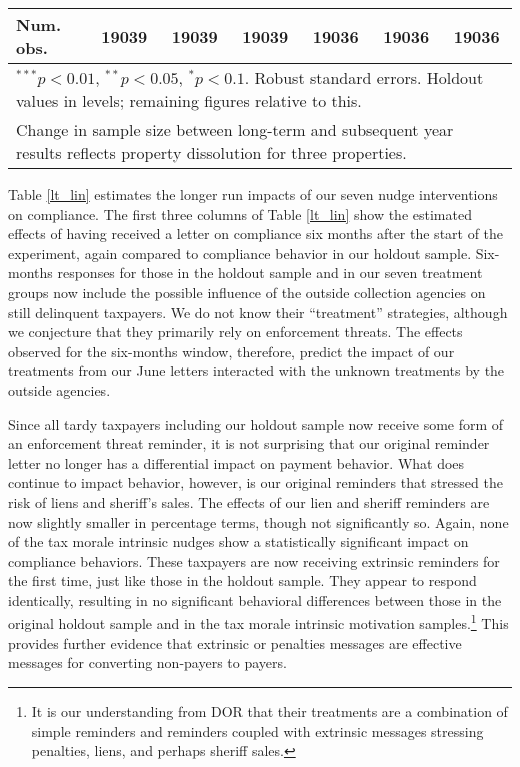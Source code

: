 \documentclass[12pt]{article}
\begin{document}
\begin{table}[htbp]
\begin{center}
\begin{tabular}{l c c c c c c }
\hline
Num. obs.    & 19039        & 19039        & 19039         & 19036        & 19036        & 19036          \\
\hline
\multicolumn{7}{l}{\scriptsize{$^{***}p<0.01$, $^{**}p<0.05$,
    $^*p<0.1$. Robust standard errors. Holdout values in levels;
    remaining figures relative to this.}} \\
\multicolumn{7}{l}{\scriptsize{Change in sample size between long-term
    and subsequent year results reflects property dissolution for
    three properties.}}
\end{tabular}
\end{center}
\end{table}

Table \ref{lt_lin} estimates the longer run impacts of our seven nudge
interventions on compliance.  The first three columns of Table
\ref{lt_lin} show the estimated effects of having received a letter on
compliance six months after the start of the experiment, again
compared to compliance behavior in our holdout sample.  Six-months
responses for those in the holdout sample and in our seven treatment
groups now include the possible influence of the outside collection
agencies on still delinquent taxpayers. We do not know their
``treatment'' strategies, although we conjecture that they primarily
rely on enforcement threats. The effects observed for the six-months
window, therefore, predict the impact of our treatments from our June
letters interacted with the unknown treatments by the outside
agencies.

Since all tardy taxpayers including our holdout sample now receive
some form of an enforcement threat reminder, it is not surprising that
our original reminder letter no longer has a differential impact on
payment behavior. What does continue to impact behavior, however, is
our original reminders that stressed the risk of liens and sheriff's
sales. The effects of our lien and sheriff reminders are now slightly
smaller in percentage terms, though not significantly so. Again, none
of the tax morale intrinsic nudges show a statistically significant
impact on compliance behaviors.  These taxpayers are now receiving
extrinsic reminders for the first time, just like those in the holdout
sample. They appear to respond identically, resulting in no
significant behavioral differences between those in the original
holdout sample and in the tax morale intrinsic motivation
samples.\footnote{It is our understanding from DOR that their
  treatments are a combination of simple reminders and reminders
  coupled with extrinsic messages stressing penalties, liens, and
  perhaps sheriff sales.}  This provides further evidence that
extrinsic or penalties messages are effective messages for converting
non-payers to payers.
\end{document}
